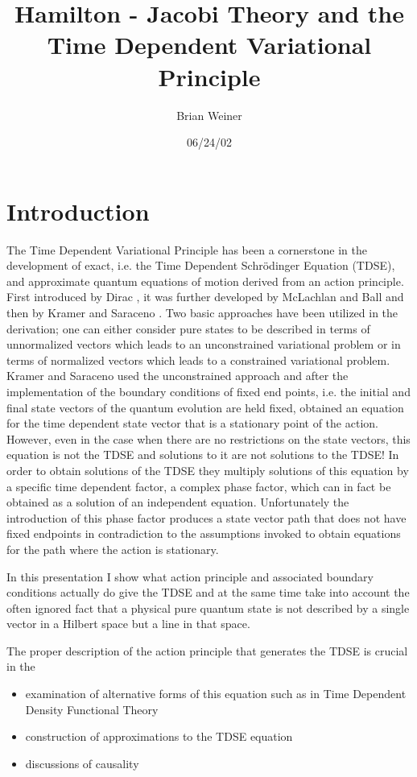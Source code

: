\documentclass[aps,preprint]{revtex4}%
\begin{document}
\preprint{ }
\title[TDVP-HJ ]{Hamilton - Jacobi Theory and the Time Dependent Variational Principle }
\author{Brian Weiner}
\date{06/24/02}
\maketitle
\tableofcontents


\section{Introduction}

The Time Dependent Variational Principle has been a cornerstone in the
development of exact, i.e. the Time Dependent Schr\"{o}dinger Equation (TDSE),
and approximate quantum equations of motion derived from an action principle.
First introduced by Dirac \cite{dirac}, it was further developed by McLachlan
and Ball \cite{mac&ball} and then by Kramer and Saraceno \cite{kram&sar}. Two
basic approaches have been utilized in the derivation; one can either consider
pure states to be described in terms of unnormalized vectors which leads to an
unconstrained variational problem or in terms of normalized vectors which
leads to a constrained variational problem. Kramer and Saraceno used the
unconstrained approach and after the implementation of the boundary conditions
of fixed end points, i.e. the initial and final state vectors of the quantum
evolution are held fixed, obtained an equation for the time dependent state
vector that is a stationary point of the action. However, even in the case
when there are no restrictions on the state vectors, this equation is not the
TDSE and solutions to it are not solutions to the TDSE! In order to obtain
solutions of the TDSE they multiply solutions of this equation by a specific
time dependent factor, a complex phase factor, which can in fact be obtained
as a solution of an independent equation. Unfortunately the introduction of
this phase factor produces a state vector path that does not have fixed
endpoints in contradiction to the assumptions invoked to obtain equations for
the path where the action is stationary.

In this presentation I show what action principle and associated boundary
conditions actually do give the TDSE and at the same time take into account
the often ignored fact that a physical pure quantum state is not described by
a single vector in a Hilbert space but a line in that space.

The proper description of the action principle that generates the TDSE is
crucial in the

\begin{itemize}
\item examination of alternative forms of this equation such as in Time
Dependent Density Functional Theory

\item construction of approximations to the TDSE equation

\item discussions of causality
\end{itemize}
\end{document}
